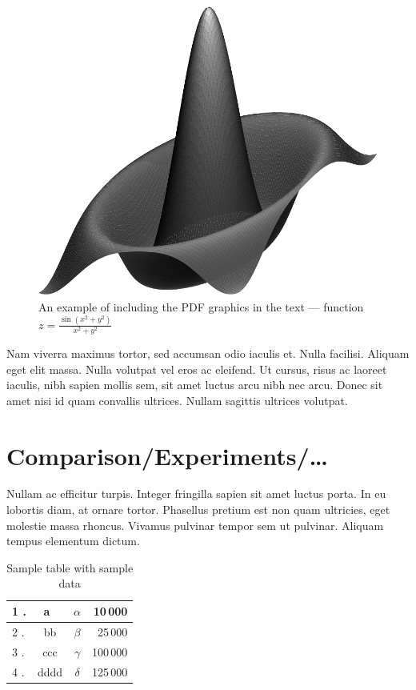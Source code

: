 \documentclass[10pt]{article}
\begin{document}
\begin{figure}[!ht]
\centering
\includegraphics[scale=.4]{surfz}
\caption{An example of including the PDF graphics in the text ---
function $z=\frac{\sin(x^2+y^2)}{x^2+y^2}$}
\label{rys:surf}
\end{figure}

Nam viverra maximus tortor, sed accumsan odio iaculis et. Nulla facilisi. Aliquam eget elit massa. Nulla volutpat vel eros ac eleifend. Ut cursus, risus ac laoreet iaculis, nibh sapien mollis sem, sit amet luctus arcu nibh nec arcu. Donec sit amet nisi id quam convallis ultrices. Nullam sagittis ultrices volutpat. 

\section{Comparison/Experiments/\ldots}

Nullam ac efficitur turpis. Integer fringilla sapien sit amet luctus porta. In eu lobortis diam, at ornare tortor. Phasellus pretium est non quam ultricies, eget molestie massa rhoncus. Vivamus pulvinar tempor sem ut pulvinar. Aliquam tempus elementum dictum.

\begin{table}[!ht]
\centering
\caption{Sample table with sample data}
\label{tabl.1}
  \begin{tabular}{|l<{.}|c|>{$}c<{$}|r|}
                                 \hline
   1 & a~   & \alpha &  10\,000\\\hline
   2 & bb   & \beta  &  25\,000\\\hline
   3 & ccc  & \gamma & 100\,000\\\hline
   4 & dddd & \delta & 125\,000\\\hline
  \end{tabular}
\end{table}
\end{document}

